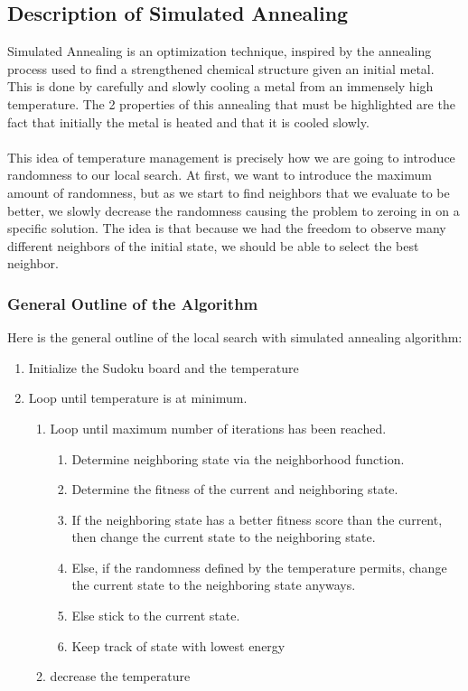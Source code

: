 \documentclass[12pt, a4paper]{article}
\begin{document}
		\subsection{Description of Simulated Annealing}
			Simulated Annealing is an optimization technique, inspired by the annealing process used to find a strengthened chemical structure given an initial metal. This is done by carefully and slowly cooling a metal from an immensely high temperature. The 2 properties of this annealing that must be highlighted are the fact that initially the metal is heated and that it is cooled slowly.\\\\
			This idea of temperature management is precisely how we are going to introduce randomness to our local search. At first, we want to introduce the maximum amount of randomness, but as we start to find neighbors that we evaluate to be better, we slowly decrease the randomness causing the problem to zeroing in on a specific solution. The idea is that because we had the freedom to observe many different neighbors of the initial state, we should be able to select the best neighbor.
			\subsubsection{General Outline of the Algorithm}
				Here is the general outline of the local search with simulated annealing algorithm:
				\begin{enumerate}
					\item Initialize the Sudoku board and the temperature
					\item Loop until temperature is at minimum.
						\begin{enumerate}
							\item Loop until maximum number of iterations has been reached.
								\begin{enumerate}
									\item Determine neighboring state via the neighborhood function.
									\item Determine the fitness of the current and neighboring state.
									\item If the neighboring state has a better fitness score than the current, then change the current state to the neighboring state.
									\item Else, if the randomness defined by the temperature permits, change the current state to the neighboring state anyways.
									\item Else stick to the current state.
									\item Keep track of state with lowest energy
								\end{enumerate}
							\item decrease the temperature
						\end{enumerate}
				\end{enumerate} 
\end{document}
